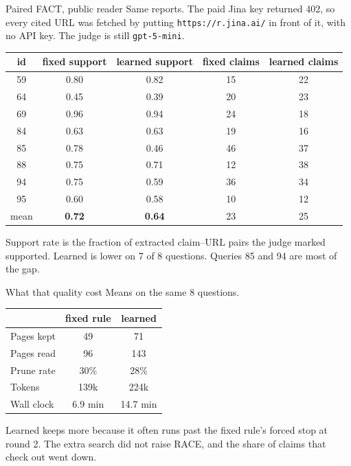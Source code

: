 \documentclass[aspectratio=169,11pt]{beamer}
\begin{document}
\begin{frame}{Paired FACT, public reader}
  Same reports. The paid Jina key returned 402, so every cited URL was fetched by putting \texttt{https://r.jina.ai/} in front of it, with no API key. The judge is still \texttt{gpt-5-mini}.
  \vspace{0.2em}
  \small
  \begin{tabular}{ccccc}
    \hline
    id & fixed support & learned support & fixed claims & learned claims \\
    \hline
    59 & 0.80 & 0.82 & 15 & 22 \\
    64 & 0.45 & 0.39 & 20 & 23 \\
    69 & 0.96 & 0.94 & 24 & 18 \\
    84 & 0.63 & 0.63 & 19 & 16 \\
    85 & 0.78 & 0.46 & 46 & 37 \\
    88 & 0.75 & 0.71 & 12 & 38 \\
    94 & 0.75 & 0.59 & 36 & 34 \\
    95 & 0.60 & 0.58 & 10 & 12 \\
    \hline
    mean & \textbf{0.72} & \textbf{0.64} & 23 & 25 \\
    \hline
  \end{tabular}
  \vspace{0.3em}
  Support rate is the fraction of extracted claim--URL pairs the judge marked supported. Learned is lower on 7 of 8 questions. Queries 85 and 94 are most of the gap.
\end{frame}

\begin{frame}{What that quality cost}
  Means on the same 8 questions.
  \vspace{0.3em}
  \begin{tabular}{lcc}
    \hline
    & fixed rule & learned \\
    \hline
    Pages kept & 49 & 71 \\
    Pages read & 96 & 143 \\
    Prune rate & 30\% & 28\% \\
    Tokens & 139k & 224k \\
    Wall clock & 6.9 min & 14.7 min \\
    \hline
  \end{tabular}
  \vspace{0.4em}
  Learned keeps more because it often runs past the fixed rule's forced stop at round 2. The extra search did not raise RACE, and the share of claims that check out went down.
\end{frame}
\end{document}
